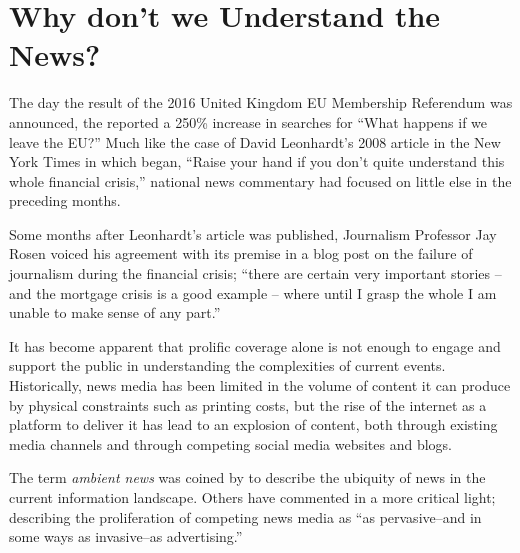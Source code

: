 \section{Why don't we Understand the News?}

The day the result of the 2016 United Kingdom EU Membership Referendum was announced, the \citeauthor{googletrends} reported a 250\% increase in searches for ``What happens if we leave the EU?'' Much like the case of David Leonhardt's 2008 article in the New York Times in which began, ``Raise your hand if you don't quite understand this whole financial crisis,'' national news commentary had focused on little else in the preceding months.

Some months after Leonhardt's article was published, Journalism Professor Jay Rosen voiced his agreement with its premise in a blog post on the failure of journalism during the financial crisis; ``there are certain very important stories -- and the mortgage crisis is a good example -- where until I grasp the whole I am unable to make sense of any part.''\citep{NationalExplainer} 

It has become apparent that prolific coverage alone is not enough to engage and support the public in understanding the complexities of current events. Historically, news media has been limited in the volume of content it can produce by physical constraints such as printing costs, but the rise of the internet as a platform to deliver it has lead to an explosion of content, both through existing media channels and through competing social media websites and blogs. 

The term \textit{ambient news} was coined by \citet{newnewsoldnews} to describe the ubiquity of news in the current information landscape. Others have commented in a more critical light; describing the proliferation of competing news media as ``as pervasive--and in some ways as invasive--as advertising.'' \citep[p.2]{overloadjournalismsbattle}


